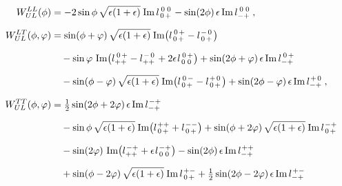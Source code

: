 \documentclass[12pt]{article}
\newcommand{\ms}{\mskip 1.5mu}
\newcommand{\im}{\operatorname{Im}}
\newcommand{\rl}[4]{l^{\ms #1 #2}_{#3 #4}}
\newcommand{\0}{{\mskip 2.5mu} 0 {\mskip 2.5mu}}
\begin{document}
\begin{align}
  \label{WUL}
W_{UL}^{LL}(\phi) &=
  - 2 \sin\phi\, \sqrt{\epsilon (1+\epsilon)}\ms \im\rl{\0}{\0}{\0}{+}
  - \sin(2\phi)\, \epsilon \im\rl{\0}{\0}{-}{+} \,,
  \phantom{\frac{1}{2}}
\nonumber \\
%
W_{UL}^{LT}(\phi,\varphi) &=
  \sin(\phi + \varphi)\, \sqrt{\epsilon (1+\epsilon)}\ms
  \im\bigl( \rl{\0}{+}{\0}{+} - \rl{-}{\0}{\0}{+} \bigr)
  \phantom{\frac{1}{2}}
\nonumber \\
& \quad{}
  - \sin\varphi\,
  \im\bigl( \rl{\0}{+}{+}{+} - \rl{-}{\0}{+}{+}
          + 2\epsilon\ms \rl{\0}{+}{\0}{\0} \bigr)
  + \sin(2\phi + \varphi)\, \epsilon \im\rl{\0}{+}{-}{+}
  \phantom{\frac{1}{2}}
\nonumber \\
& \quad{}
  - \sin(\phi - \varphi)\, \sqrt{\epsilon (1+\epsilon)}\ms
    \im\bigl( \rl{\0}{-}{\0}{+} - \rl{+}{\0}{\0}{+} \bigr)
  + \sin(2\phi - \varphi)\, \epsilon \im\rl{+}{\0}{-}{+} \,,
  \phantom{\frac{1}{2}}
\nonumber \\
%
W_{UL}^{TT}(\phi,\varphi) &=
  \tfrac{1}{2} \sin(2\phi + 2\varphi)\, \epsilon \im\rl{-}{+}{-}{+}
  \phantom{\frac{1}{2}}
\nonumber \\
& \quad{}
  - \sin\phi\, \sqrt{\epsilon (1+\epsilon)}\ms
    \im\bigl( \rl{+}{+}{\0}{+} + \rl{-}{-}{\0}{+} \bigr)
  + \sin(\phi + 2\varphi)\, \sqrt{\epsilon (1+\epsilon)}\ms
    \im\rl{-}{+}{\0}{+}
  \phantom{\frac{1}{2}}
\nonumber \\
& \quad{}
  - \sin(2\varphi)\,
    \im\bigl( \rl{-}{+}{+}{+} + \epsilon\ms \rl{-}{+}{\0}{\0} \bigr)
  - \sin(2\phi)\, \epsilon \im\rl{+}{+}{-}{+}
  \phantom{\frac{1}{2}}
\nonumber \\
& \quad{}
  + \sin(\phi - 2\varphi)\, \sqrt{\epsilon (1+\epsilon)}\ms
    \im\rl{+}{-}{\0}{+}
  + \tfrac{1}{2} \sin(2\phi - 2\varphi)\, \epsilon \im\rl{+}{-}{-}{+}
  \phantom{\frac{1}{2}}
\end{align}
\end{document}
